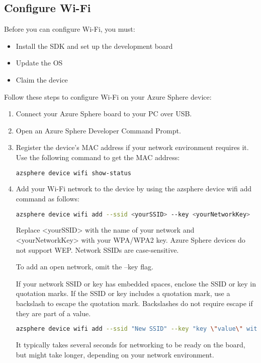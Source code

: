 \subsection{Configure Wi-Fi}
Before you can configure Wi-Fi, you must:
\begin{itemize}
    \item Install the SDK and set up the development board
    \item Update the OS
    \item Claim the device
\end{itemize}
Follow these steps to configure Wi-Fi on your Azure Sphere device:
\begin{enumerate}
    \item Connect your Azure Sphere board to your PC over USB.
    \item Open an Azure Sphere Developer Command Prompt.

    \item Register the device's MAC address if your network environment requires it. Use the following command to get the MAC address:
    \begin{lstlisting}[language=bash]
    azsphere device wifi show-status
    \end{lstlisting}
    \item Add your Wi-Fi network to the device by using the azsphere device wifi add command as follows:
    \begin{lstlisting}[language=bash]
    azsphere device wifi add --ssid <yourSSID> --key <yourNetworkKey>
    \end{lstlisting}
    
    Replace <yourSSID> with the name of your network and <yourNetworkKey> with your WPA/WPA2 key. Azure Sphere devices do not support WEP. Network SSIDs are case-sensitive. 

    To add an open network, omit the --key flag.

    If your network SSID or key has embedded spaces, enclose the SSID or key in quotation marks. If the SSID or key includes a quotation mark, use a backslash to escape the quotation mark. Backslashes do not require escape if they are part of a value.
    
    \begin{lstlisting}[language=bash]
    azsphere device wifi add --ssid "New SSID" --key "key \"value\" with quotes"
    \end{lstlisting}
    
    It typically takes several seconds for networking to be ready on the board, but might take longer, depending on your network environment.


\end{enumerate}
